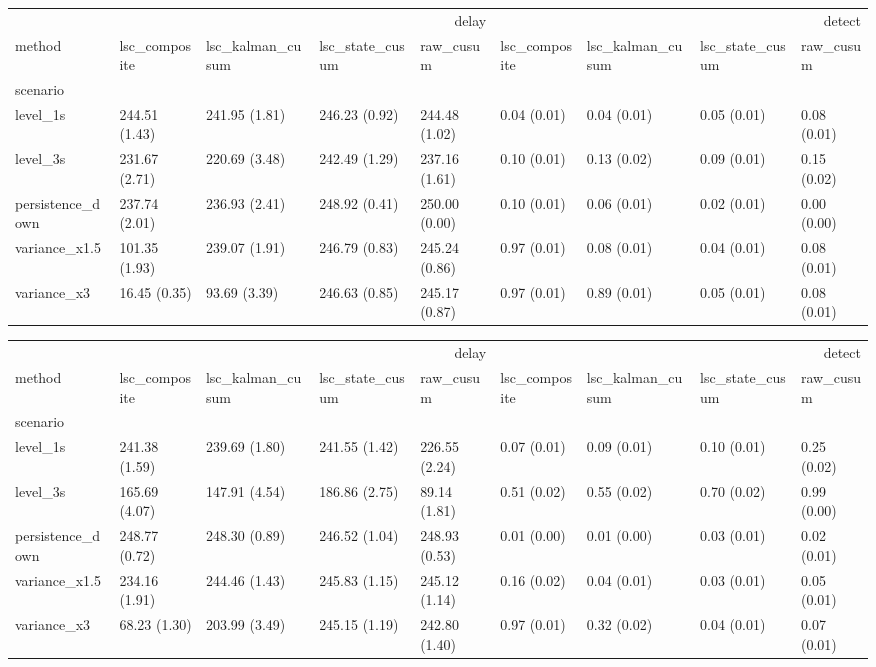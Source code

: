 \begin{tabular}{lllllllll}
\toprule
 & \multicolumn{4}{r}{delay} & \multicolumn{4}{r}{detect} \\
method & lsc_composite & lsc_kalman_cusum & lsc_state_cusum & raw_cusum & lsc_composite & lsc_kalman_cusum & lsc_state_cusum & raw_cusum \\
scenario &  &  &  &  &  &  &  &  \\
\midrule
level_1s & 244.51 (1.43) & 241.95 (1.81) & 246.23 (0.92) & 244.48 (1.02) & 0.04 (0.01) & 0.04 (0.01) & 0.05 (0.01) & 0.08 (0.01) \\
level_3s & 231.67 (2.71) & 220.69 (3.48) & 242.49 (1.29) & 237.16 (1.61) & 0.10 (0.01) & 0.13 (0.02) & 0.09 (0.01) & 0.15 (0.02) \\
persistence_down & 237.74 (2.01) & 236.93 (2.41) & 248.92 (0.41) & 250.00 (0.00) & 0.10 (0.01) & 0.06 (0.01) & 0.02 (0.01) & 0.00 (0.00) \\
variance_x1.5 & 101.35 (1.93) & 239.07 (1.91) & 246.79 (0.83) & 245.24 (0.86) & 0.97 (0.01) & 0.08 (0.01) & 0.04 (0.01) & 0.08 (0.01) \\
variance_x3 & 16.45 (0.35) & 93.69 (3.39) & 246.63 (0.85) & 245.17 (0.87) & 0.97 (0.01) & 0.89 (0.01) & 0.05 (0.01) & 0.08 (0.01) \\
\bottomrule
\end{tabular}

\begin{tabular}{lllllllll}
\toprule
 & \multicolumn{4}{r}{delay} & \multicolumn{4}{r}{detect} \\
method & lsc_composite & lsc_kalman_cusum & lsc_state_cusum & raw_cusum & lsc_composite & lsc_kalman_cusum & lsc_state_cusum & raw_cusum \\
scenario &  &  &  &  &  &  &  &  \\
\midrule
level_1s & 241.38 (1.59) & 239.69 (1.80) & 241.55 (1.42) & 226.55 (2.24) & 0.07 (0.01) & 0.09 (0.01) & 0.10 (0.01) & 0.25 (0.02) \\
level_3s & 165.69 (4.07) & 147.91 (4.54) & 186.86 (2.75) & 89.14 (1.81) & 0.51 (0.02) & 0.55 (0.02) & 0.70 (0.02) & 0.99 (0.00) \\
persistence_down & 248.77 (0.72) & 248.30 (0.89) & 246.52 (1.04) & 248.93 (0.53) & 0.01 (0.00) & 0.01 (0.00) & 0.03 (0.01) & 0.02 (0.01) \\
variance_x1.5 & 234.16 (1.91) & 244.46 (1.43) & 245.83 (1.15) & 245.12 (1.14) & 0.16 (0.02) & 0.04 (0.01) & 0.03 (0.01) & 0.05 (0.01) \\
variance_x3 & 68.23 (1.30) & 203.99 (3.49) & 245.15 (1.19) & 242.80 (1.40) & 0.97 (0.01) & 0.32 (0.02) & 0.04 (0.01) & 0.07 (0.01) \\
\bottomrule
\end{tabular}
